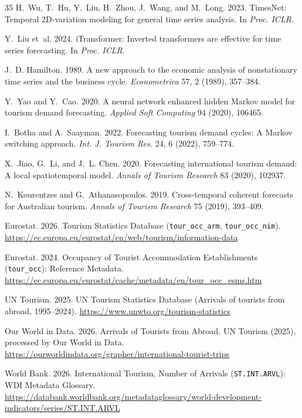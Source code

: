 \documentclass[sigconf]{acmart}
\begin{document}
\begin{thebibliography}{35}
H.~Wu, T.~Hu, Y.~Liu, H.~Zhou, J.~Wang, and M.~Long. 2023. TimesNet: Temporal 2D-variation modeling for general time series analysis. In \emph{Proc. ICLR}.

Y.~Liu et~al. 2024. iTransformer: Inverted transformers are effective for time series forecasting. In \emph{Proc. ICLR}.

J.~D. Hamilton. 1989. A new approach to the economic analysis of nonstationary time series and the business cycle. \emph{Econometrica} 57, 2 (1989), 357--384.

Y.~Yao and Y.~Cao. 2020. A neural network enhanced hidden Markov model for tourism demand forecasting. \emph{Applied Soft Computing} 94 (2020), 106465.

I.~Botha and A.~Saayman. 2022. Forecasting tourism demand cycles: A Markov switching approach. \emph{Int. J. Tourism Res.} 24, 6 (2022), 759--774.

X.~Jiao, G.~Li, and J.~L. Chen. 2020. Forecasting international tourism demand: A local spatiotemporal model. \emph{Annals of Tourism Research} 83 (2020), 102937.

N.~Kourentzes and G.~Athanasopoulos. 2019. Cross-temporal coherent forecasts for Australian tourism. \emph{Annals of Tourism Research} 75 (2019), 393--409.

Eurostat. 2026. Tourism Statistics Database (\texttt{tour\_occ\_arm}, \texttt{tour\_occ\_nim}). \url{https://ec.europa.eu/eurostat/en/web/tourism/information-data}

Eurostat. 2024. Occupancy of Tourist Accommodation Establishments (\texttt{tour\_occ}): Reference Metadata. \url{https://ec.europa.eu/eurostat/cache/metadata/en/tour_occ_esms.htm}

UN Tourism. 2025. UN Tourism Statistics Database (Arrivals of tourists from abroad, 1995--2024). \url{https://www.unwto.org/tourism-statistics}

Our World in Data. 2026. Arrivals of Tourists from Abroad. UN Tourism (2025), processed by Our World in Data. \url{https://ourworldindata.org/grapher/international-tourist-trips}

World Bank. 2026. International Tourism, Number of Arrivals (\texttt{ST.INT.ARVL}): WDI Metadata Glossary. \url{https://databank.worldbank.org/metadataglossary/world-development-indicators/series/ST.INT.ARVL}


\end{thebibliography}
\end{document}
